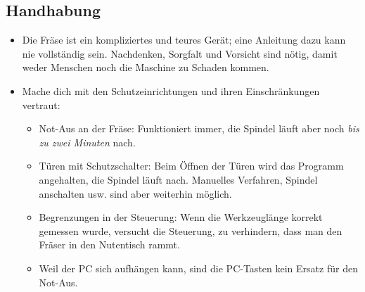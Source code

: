 \documentclass{\basedir/fablab-document}
\begin{document}
\subsection{Handhabung}
\begin{itemize}
 \item Die Fräse ist ein kompliziertes und teures Gerät; eine Anleitung dazu kann nie vollständig sein. Nachdenken, Sorgfalt und Vorsicht sind nötig, damit weder Menschen noch die Maschine zu Schaden kommen.
 \item Mache dich mit den Schutzeinrichtungen und ihren Einschränkungen vertraut:
\begin{itemize}
 \item Not-Aus an der Fräse: Funktioniert immer, die Spindel läuft aber noch \emph{bis zu zwei Minuten} nach.
 \item Türen mit Schutzschalter: Beim Öffnen der Türen wird das Programm angehalten, die Spindel läuft nach. Manuelles Verfahren, Spindel anschalten usw. sind aber weiterhin möglich.
 \item Begrenzungen in der Steuerung: Wenn die Werkzeuglänge korrekt gemessen wurde, versucht die Steuerung, zu verhindern, dass man den Fräser in den Nutentisch rammt.
 \item Weil der PC sich aufhängen kann, sind die PC-Tasten kein Ersatz für den Not-Aus.
\end{itemize}


\end{itemize}
\end{document}
